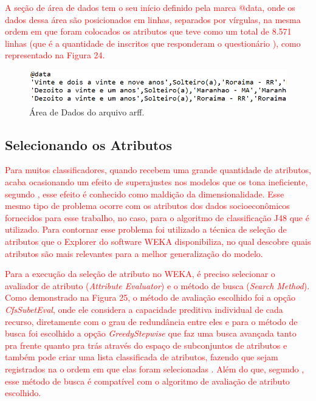 \par
\textcolor{red}{A seção de área de dados tem o seu início definido pela marca @data, onde os dados dessa área são posicionados em linhas, separados por vírgulas, na mesma ordem em que foram colocados os atributos que teve como um total de 8.571 linhas (que é a quantidade de inscritos que responderam o questionário ), como representado na Figura 24.}

\par
\begin{figure}[!htp]
	\begin{center}
    \caption{\label{fig:waveform_fig} Área de Dados do arquivo arff.}
	\includegraphics[scale=0.60]{Figuras/arquivo_arff_2.png}
	\end{center}
\end{figure}


\subsection{Selecionando os Atributos}

\par
\textcolor{red}{Para muitos classificadores, quando recebem uma grande quantidade de atributos, acaba ocasionando um efeito de superajustes nos modelos que os tona ineficiente, segundo , esse efeito é conhecido como maldição da dimensionalidade. Esse mesmo tipo de problema ocorre com os atributos dos dados socioeconômicos fornecidos para esse trabalho, no caso, para o algoritmo de classificação J48 que é utilizado. Para contornar esse problema foi utilizado a técnica de seleção de atributos que o Explorer do software WEKA disponibiliza, no qual descobre quais atributos são mais relevantes para a melhor generalização do modelo.}

\par
\textcolor{red}{Para a execução da seleção de atributo no WEKA, é preciso selecionar o avaliador de atributo (\textit{Attribute Evaluator}) e o método de busca (\textit{Search Method}). Como demonstrado na Figura 25, o método de avaliação escolhido foi a opção \textit{CfsSubetEval}, onde ele considera a capacidade preditiva individual de cada recurso, diretamente com o grau de redundância entre eles e para o método de busca foi escolhido a opção \textit{GreedyStepwise} que faz uma busca avançada tanto pra frente quanto pra trás através do espaço de subconjuntos de atributos e também pode criar uma lista classificada de atributos, fazendo que sejam registrados na o ordem em que elas foram selecionadas \cite{WEKA}. Além do que, segundo , esse método de busca é compatível com o algoritmo de avaliação de atributo escolhido. }

